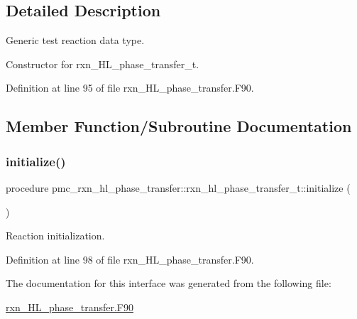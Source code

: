 \subsection{Detailed Description}
Generic test reaction data type. 

Constructor for rxn\+\_\+\+H\+L\+\_\+phase\+\_\+transfer\+\_\+t. 

Definition at line 95 of file rxn\+\_\+\+H\+L\+\_\+phase\+\_\+transfer.\+F90.



\subsection{Member Function/\+Subroutine Documentation}
\mbox{\label{structpmc__rxn__hl__phase__transfer_1_1rxn__hl__phase__transfer__t_a777c26fa56c78459ed3ea6a87f871992}} 
\subsubsection{\texorpdfstring{initialize()}{initialize()}}
{\footnotesize\ttfamily procedure pmc\+\_\+rxn\+\_\+hl\+\_\+phase\+\_\+transfer\+::rxn\+\_\+hl\+\_\+phase\+\_\+transfer\+\_\+t\+::initialize (\begin{DoxyParamCaption}{ }\end{DoxyParamCaption})\hspace{0.3cm}{\ttfamily [private]}}



Reaction initialization. 



Definition at line 98 of file rxn\+\_\+\+H\+L\+\_\+phase\+\_\+transfer.\+F90.



The documentation for this interface was generated from the following file\+:\begin{DoxyCompactItemize}
\item 
\mbox{\hyperlink{rxn___h_l__phase__transfer_8_f90}{rxn\+\_\+\+H\+L\+\_\+phase\+\_\+transfer.\+F90}}\end{DoxyCompactItemize}
